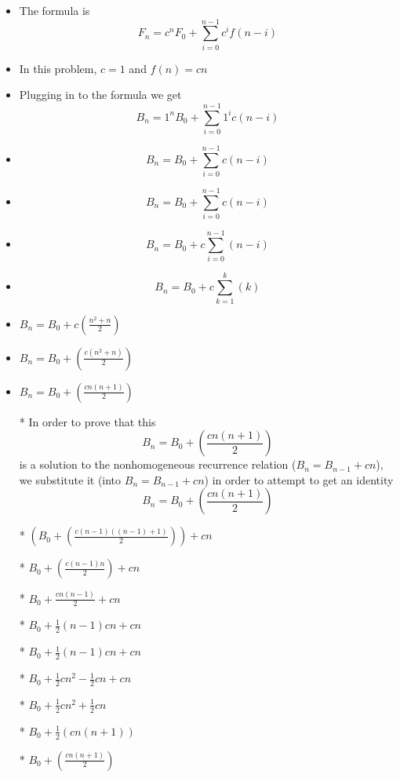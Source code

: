 \documentclass{article}
\begin{document}
\begin{enumerate}
\begin{enumerate}
\begin{itemize}
    \item The formula is $$F_{n}=c^{n}F_{0} + \sum\limits_{i=0}^{n-1}c^{i}f(n-i)$$
    \item In this problem, $c=1$ and $f(n)=cn$
    \item Plugging in to the formula we get $$B_{n}=1^{n}B_{0} + \sum\limits_{i=0}^{n-1}1^{i}c(n-i)$$
    \item $$B_{n}=B_{0} + \sum\limits_{i=0}^{n-1}c(n-i)$$
    \item $$B_{n}=B_{0} + \sum\limits_{i=0}^{n-1}c(n-i)$$
    \item $$B_{n}=B_{0} + c\sum\limits_{i=0}^{n-1}(n-i)$$
    \item $$B_{n}=B_{0} + c\sum\limits_{k=1}^{k}(k)$$
    \item $B_{n}=B_{0} + c\left(\frac{n^{2}+n}{2}\right)$
    \item $B_{n}=B_{0} + \left(\frac{c\left(n^{2}+n\right)}{2}\right)$
    \item $B_{n}=B_{0} + \left(\frac{cn\left(n+1\right)}{2}\right)$
    \item [*] In order to prove that this $$B_{n}=B_{0} + \left(\frac{cn\left(n+1\right)}{2}\right)$$ is a solution to the nonhomogeneous recurrence relation ($B_{n}=B_{n-1}+cn$), we substitute it (into $B_{n}=B_{n-1}+cn$) in order to attempt to get an identity $$B_{n}=B_{0} + \left(\frac{cn\left(n+1\right)}{2}\right)$$
    \item [*] $\left(B_{0}+\left(\frac{c(n-1)\left((n-1)+1\right)}{2}\right)\right)+cn$
    \item [*] $B_{0}+\left(\frac{c(n-1)n}{2}\right)+cn$
    \item [*] $B_{0}+\frac{cn(n-1)}{2}+cn$
    \item [*] $B_{0}+\frac{1}{2}(n-1)cn+cn$
    \item [*] $B_{0}+\frac{1}{2}(n-1)cn+cn$
    \item [*] $B_{0}+\frac{1}{2}cn^{2}-\frac{1}{2}cn+cn$
    \item [*] $B_{0}+\frac{1}{2}cn^{2}+\frac{1}{2}cn$
    \item [*] $B_{0}+\frac{1}{2}(cn(n+1))$
    \item [*] $B_{0}+\left(\frac{cn(n+1)}{2}\right)$
    \end{itemize}
  \end{enumerate}

\end{enumerate}
\end{document}
